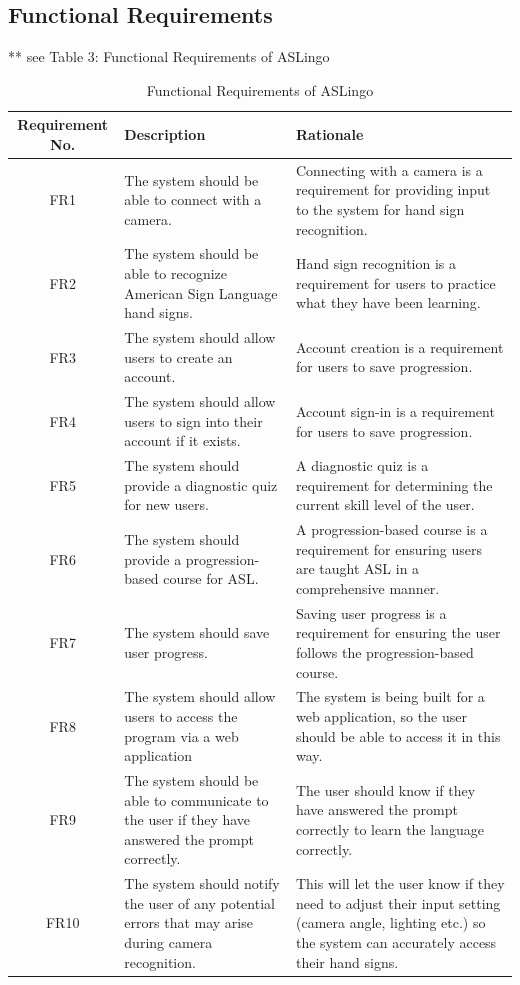 \documentclass[12pt, titlepage]{article}
\begin{document}
\subsection{Functional Requirements}
 
** see Table 3: Functional Requirements of ASLingo \\

\begin{table}[H]
\caption{Functional Requirements of ASLingo}
\noindent \begin{tabular}{| c | p{4cm}| p{6cm}|}
\hline 
\textbf{Requirement No.} & \textbf{Description} &\textbf{Rationale}\\
\hline
FR1 & The system should be able to connect with a camera. & Connecting with a camera is a requirement for providing input to the system for hand sign recognition. \\
\hline
FR2 & The system should be able to recognize American Sign Language hand signs. & Hand sign recognition is a requirement for users to practice what they have been learning. \\
\hline
FR3 & The system should allow users to create an account. & Account creation is a requirement for users to save progression. \\
\hline
FR4 & The system should allow users to sign into their account if it exists. & Account sign-in is a requirement for users to save progression. \\
\hline
FR5 & The system should provide a diagnostic quiz for new users. & A diagnostic quiz is a requirement for determining the current skill level of the user. \\
\hline
FR6 & The system should provide a progression-based course for ASL. & A progression-based course is a requirement for ensuring users are taught ASL in a comprehensive manner. \\
\hline
FR7 & The system should save user progress. & Saving user progress is a requirement for ensuring the user follows the progression-based course. \\
\hline
FR8 & The system should allow users to access the program via a web application & The system is being built for a web application, so the user should be able to access it in this way. \\
\hline
FR9 & The system should be able to communicate to the user if they have answered the prompt correctly. & The user should know if they have answered the prompt correctly to learn the language correctly. \\ 
\hline
FR10 & The system should notify the user of any potential errors that may arise during camera recognition. & This will let the user know if they need to adjust their input setting (camera angle, lighting etc.) so the system can accurately access their hand signs. \\
\bottomrule
\end{tabular}
\end{table}
\end{document}
